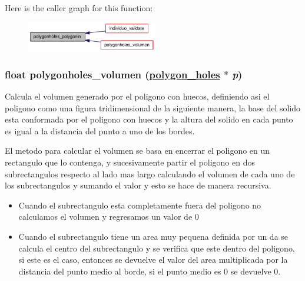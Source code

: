 Here is the caller graph for this function:\begin{figure}[H]
\begin{center}
\leavevmode
\includegraphics[width=161pt]{group__geometry_g496bae87588cb5710ced80f713da98ad_g496bae87588cb5710ced80f713da98ad_icgraph}
\end{center}
\end{figure}
\hypertarget{group__geometry_g7cf8b3f8c76179bb936754bbbf510999_g7cf8b3f8c76179bb936754bbbf510999}{
\subsubsection[polygonholes\_\-volumen]{\setlength{\rightskip}{0pt plus 5cm}float polygonholes\_\-volumen (\hyperlink{struct__polygon__holes}{polygon\_\-holes} $\ast$ {\em p})}}
\label{group__geometry_g7cf8b3f8c76179bb936754bbbf510999_g7cf8b3f8c76179bb936754bbbf510999}


Calcula el volumen generado por el poligono con huecos, definiendo asi el poligono como una figura tridimensional de la siguiente manera, la base del solido esta conformada por el poligono con huecos y la altura del solido en cada punto es igual a la distancia del punto a uno de los bordes.

El metodo para calcular el volumen se basa en encerrar el poligono en un rectangulo que lo contenga, y sucesivamente partir el poligono en dos subrectangulos respecto al lado mas largo calculando el volumen de cada uno de los subrectangulos y sumando el valor y esto se hace de manera recursiva.

\begin{itemize}
\item Cuando el subrectangulo esta completamente fuera del poligono no calculamos el volumen y regresamos un valor de 0\end{itemize}


\begin{itemize}
\item Cuando el subrectangulo tiene un area muy pequena definida por un da se calcula el centro del subrectangulo y se verifica que este dentro del poligono, si este es el caso, entonces se devuelve el valor del area multiplicada por la distancia del punto medio al borde, si el punto medio es 0 se devuelve 0.\end{itemize}


